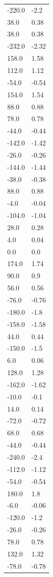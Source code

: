 \begin{longtable}{ll}
-220.0 & -2.2 \\
38.0 & 0.38 \\
38.0 & 0.38 \\
-232.0 & -2.32 \\
158.0 & 1.58 \\
112.0 & 1.12 \\
-54.0 & -0.54 \\
154.0 & 1.54 \\
88.0 & 0.88 \\
78.0 & 0.78 \\
-44.0 & -0.44 \\
-142.0 & -1.42 \\
-26.0 & -0.26 \\
-144.0 & -1.44 \\
-38.0 & -0.38 \\
88.0 & 0.88 \\
-4.0 & -0.04 \\
-104.0 & -1.04 \\
28.0 & 0.28 \\
4.0 & 0.04 \\
0.0 & 0.0 \\
174.0 & 1.74 \\
90.0 & 0.9 \\
56.0 & 0.56 \\
-76.0 & -0.76 \\
-180.0 & -1.8 \\
-158.0 & -1.58 \\
44.0 & 0.44 \\
-150.0 & -1.5 \\
6.0 & 0.06 \\
128.0 & 1.28 \\
-162.0 & -1.62 \\
-10.0 & -0.1 \\
14.0 & 0.14 \\
-72.0 & -0.72 \\
68.0 & 0.68 \\
-44.0 & -0.44 \\
-240.0 & -2.4 \\
-112.0 & -1.12 \\
-54.0 & -0.54 \\
180.0 & 1.8 \\
-6.0 & -0.06 \\
-120.0 & -1.2 \\
-26.0 & -0.26 \\
78.0 & 0.78 \\
132.0 & 1.32 \\
-78.0 & -0.78 \\

\end{longtable}

